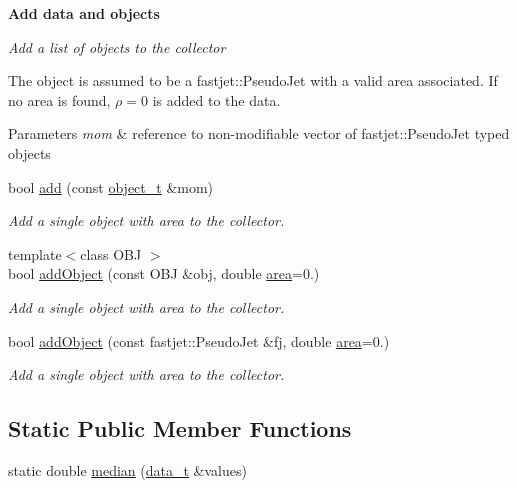 \begin{Indent}{\bf Add data and objects}\par
{\em Add a list of objects to the collector

The object is assumed to be a {\ttfamily fastjet\+::\+Pseudo\+Jet} with a valid area associated. If no area is found, $ \rho = 0 $ is added to the data.


\begin{DoxyParams}{Parameters}
{\em mom} & reference to non-\/modifiable vector of {\ttfamily fastjet\+::\+Pseudo\+Jet} typed objects \\
\hline
\end{DoxyParams}
}\begin{DoxyCompactItemize}
\item 
bool \hyperlink{classSlidingWindow_1_1Window_aa8463b76b792d875ded8616db02e8c09}{add} (const \hyperlink{classSlidingWindow_1_1Window_a0ee13c18faf2f2ec3855b6449ef765e0}{object\+\_\+t} \&mom)
\begin{DoxyCompactList}\small\item\em Add a single object with area to the collector. \end{DoxyCompactList}\item 
{\footnotesize template$<$class O\+BJ $>$ }\\bool \hyperlink{classSlidingWindow_1_1Window_a172533181c0916537bb48c3b6d56d2ec}{add\+Object} (const O\+BJ \&obj, double \hyperlink{classSlidingWindow_1_1Window_a76aea1b4663a127bae0fd7a67a0b52b3}{area}=0.)
\begin{DoxyCompactList}\small\item\em Add a single object with area to the collector. \end{DoxyCompactList}\item 
bool \hyperlink{classSlidingWindow_1_1Window_a5367773eb3a8d3733e234be5f6bba901}{add\+Object} (const fastjet\+::\+Pseudo\+Jet \&fj, double \hyperlink{classSlidingWindow_1_1Window_a76aea1b4663a127bae0fd7a67a0b52b3}{area}=0.)
\begin{DoxyCompactList}\small\item\em Add a single object with area to the collector. \end{DoxyCompactList}\end{DoxyCompactItemize}
\end{Indent}
\subsection*{Static Public Member Functions}
\begin{DoxyCompactItemize}
\item 
static double \hyperlink{classSlidingWindow_1_1Window_a53b2cc3cc4fe5090e947d58aa05b943c}{median} (\hyperlink{classSlidingWindow_1_1Window_abc07b028eea17a8713e74a556b9d1ad2}{data\+\_\+t} \&values)
\end{DoxyCompactItemize}

